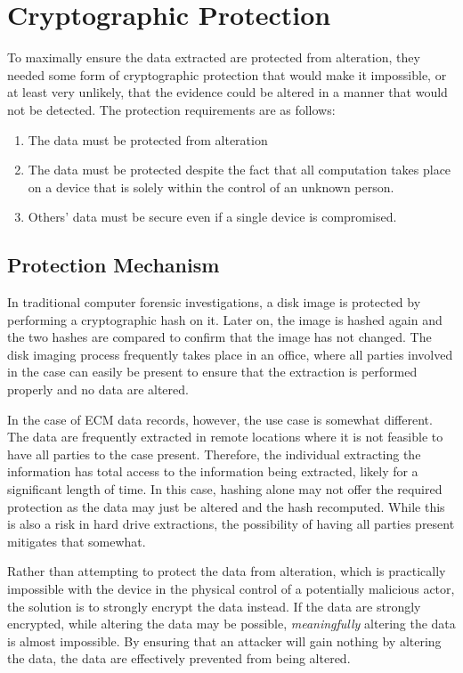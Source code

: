 \chapter{Cryptographic Protection}

To maximally ensure the data extracted are protected from alteration,
they needed some form of cryptographic protection that would make it impossible, or at
least very unlikely, that the evidence could be altered in a manner that would not be
detected. The protection requirements are as follows:

\begin{enumerate}
  \item The data must be protected from alteration
  \item The data must be protected despite the fact that all computation takes
        place on a device that is solely within the control of an unknown person.
  \item Others' data must be secure even if a single device is compromised.

\end{enumerate}

\section{Protection Mechanism}

In traditional computer forensic investigations, a disk image is protected by performing
a cryptographic hash on it. Later on, the image is hashed again and the two hashes are compared
to confirm that the image has not changed. The disk imaging process frequently takes place in an
office, where all parties involved in the case can easily be present to ensure that the extraction
is performed properly and no data are altered.

In the case of ECM data records, however, the use case is somewhat different. The data are frequently
extracted in remote locations where it is not feasible to have all parties to the case present. Therefore,
the individual extracting the information has total access to the information being extracted, likely for
a significant length of time. In this case, hashing alone may not offer the required protection as the data
may just be altered and the hash recomputed. While this is also a risk in hard drive extractions, the possibility
of having all parties present mitigates that somewhat.

Rather than attempting to protect the data from alteration, which is practically impossible with the device
in the physical control of a potentially malicious actor, the solution is to strongly encrypt
the data instead. If the data are strongly encrypted, while altering the data may be possible, 
\emph{meaningfully} altering the data is almost impossible. By ensuring that an attacker will gain nothing by
altering the data, the data are effectively prevented from being altered.

